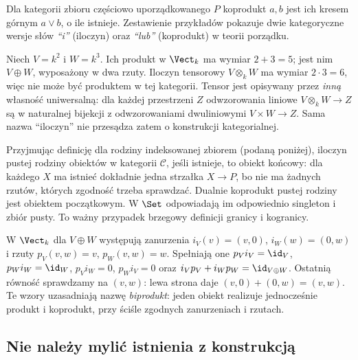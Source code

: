 \begin{przyklad}
Dla kategorii zbioru częściowo uporządkowanego $P$ koprodukt $a,b$ jest ich kresem górnym $a\vee b$, o ile istnieje. Zestawienie przykładów pokazuje dwie kategoryczne wersje słów \emph{``i''} (iloczyn) oraz \emph{``lub''} (koprodukt) w teorii porządku.
\end{przyklad}


\begin{przyklad}
Niech $V=k^2$ i $W=k^3$. Ich produkt w $\Vect_k$ ma wymiar $2+3=5$; jest nim $V\oplus W$, wyposażony w dwa rzuty. Iloczyn tensorowy $V\otimes_k W$ ma wymiar $2\cdot3=6$, więc nie może być produktem w tej kategorii. Tensor jest opisywany przez \emph{inną} własność uniwersalną: dla każdej przestrzeni $Z$ odwzorowania liniowe $V\otimes_k W\to Z$ są w naturalnej bijekcji z odwzorowaniami dwuliniowymi $V\times W\to Z$. Sama nazwa ``iloczyn'' nie przesądza zatem o konstrukcji kategorialnej.
\end{przyklad}

\begin{przyklad}
Przyjmując definicję dla rodziny indeksowanej zbiorem (podaną poniżej), iloczyn pustej rodziny obiektów w kategorii $\mathcal C$, jeśli istnieje, to obiekt końcowy: dla każdego $X$ ma istnieć dokładnie jedna strzałka $X\to P$, bo nie ma żadnych rzutów, których zgodność trzeba sprawdzać. Dualnie koprodukt pustej rodziny jest obiektem początkowym. W $\Set$ odpowiadają im odpowiednio singleton i zbiór pusty. To ważny przypadek brzegowy definicji granicy i kogranicy.
\end{przyklad}

\begin{przyklad}
W $\Vect_k$ dla $V\oplus W$ występują zanurzenia $i_V(v)=(v,0)$, $i_W(w)=(0,w)$ i rzuty $p_V(v,w)=v$, $p_W(v,w)=w$. Spełniają one $p_Vi_V=\id_V$, $p_Wi_W=\id_W$, $p_Vi_W=0$, $p_Wi_V=0$ oraz $i_Vp_V+i_Wp_W=\id_{V\oplus W}$. Ostatnią równość sprawdzamy na $(v,w)$: lewa strona daje $(v,0)+(0,w)=(v,w)$. Te wzory uzasadniają nazwę \emph{biprodukt}: jeden obiekt realizuje jednocześnie produkt i koprodukt, przy ściśle zgodnych zanurzeniach i rzutach.
\end{przyklad}


\subsection{Nie należy mylić istnienia z konstrukcją}

